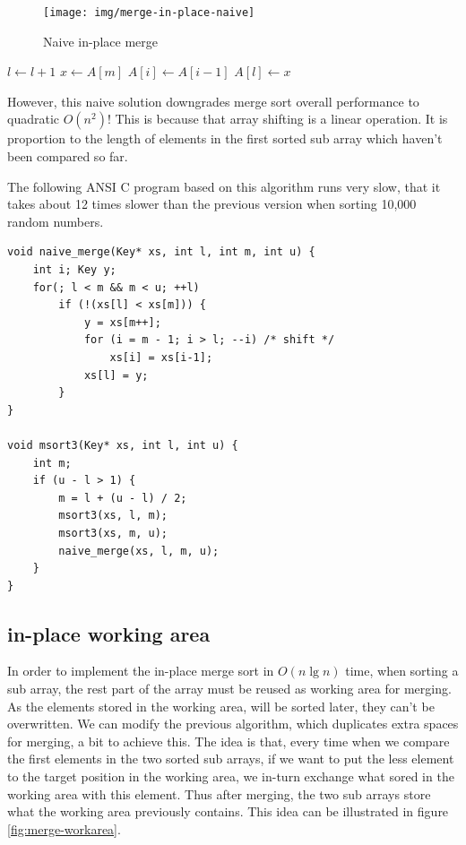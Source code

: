 \documentclass[b5paper]{article}
\begin{document}
\begin{figure}[htbp]
 \centering
 \texttt{[image: img/merge-in-place-naive]}
 \caption{Naive in-place merge}
 \label{fig:merge-in-place-naive}
\end{figure}

\begin{algorithmic}[1]
      \State $l \gets l + 1$
    \Else
      \State $x \gets A[m]$
       
        \State $A[i] \gets A[i-1]$
      \EndFor
      \State $A[l] \gets x$
    \EndIf
  \EndWhile
\EndProcedure
\end{algorithmic}

However, this naive solution downgrades merge sort overall performance to quadratic $O(n^2)$! This is because
that array shifting is a linear operation. It is proportion to the length of elements in
the first sorted sub array which haven't been compared so far.

The following ANSI C program based on this algorithm runs very slow, that it takes about 12 times slower than
the previous version when sorting 10,000 random numbers.

\lstset{language=C}
\begin{lstlisting}
void naive_merge(Key* xs, int l, int m, int u) {
    int i; Key y;
    for(; l < m && m < u; ++l)
        if (!(xs[l] < xs[m])) {
            y = xs[m++];
            for (i = m - 1; i > l; --i) /* shift */
                xs[i] = xs[i-1];
            xs[l] = y;
        }
}

void msort3(Key* xs, int l, int u) {
    int m;
    if (u - l > 1) {
        m = l + (u - l) / 2;
        msort3(xs, l, m);
        msort3(xs, m, u);
        naive_merge(xs, l, m, u);
    }
}
\end{lstlisting}

\subsection{in-place working area}
In order to implement the in-place merge sort in $O(n \lg n)$ time, when sorting a sub array, the rest part of
the array must be reused as working area for merging. As the elements stored in the working area, will be sorted
later, they can't be overwritten. We can modify the previous algorithm, which duplicates extra spaces for merging,
a bit to achieve this. The idea is that, every time when we compare the first elements in the two sorted sub
arrays, if we want to put the less element to the target position in the working area, we in-turn exchange what
sored in the working area with this element. Thus after merging, the two sub arrays store what the working area
previously contains. This idea can be illustrated in figure \ref{fig:merge-workarea}.
\end{document}

